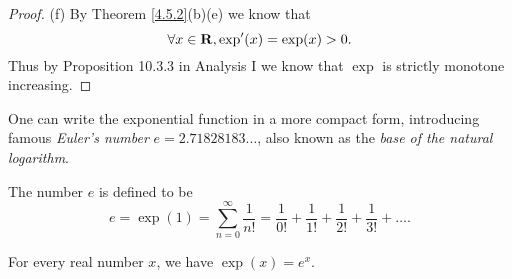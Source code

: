 \begin{proof}{(f)}
    By Theorem \ref{4.5.2}(b)(e) we know that
    \[
        \forall x \in \mathbf{R}, \exp'(x) = \exp(x) > 0.
    \]
    Thus by Proposition 10.3.3 in Analysis I we know that \(\exp\) is strictly monotone increasing.
\end{proof}

\begin{note}
    One can write the exponential function in a more compact form, introducing famous \emph{Euler's number} \(e = 2.71828183 \dots\), also known as the \emph{base of the natural logarithm}.
\end{note}

\begin{definition}\label{4.5.3}
    The number \(e\) is defined to be
    \[
        e = \exp(1) = \sum_{n = 0}^\infty \frac{1}{n!} = \frac{1}{0!} + \frac{1}{1!} + \frac{1}{2!} + \frac{1}{3!} + \dots.
    \]
\end{definition}

\begin{proposition}\label{4.5.4}
    For every real number \(x\), we have \(\exp(x) = e^x\).
\end{proposition}

